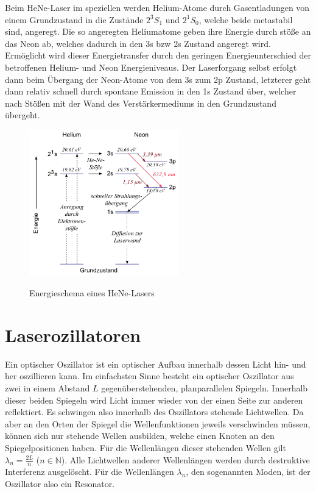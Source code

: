 \documentclass[bigchapter,colorback,accentcolor=tud4b,linedtoc,11pt]{tudreport}
\numberwithin{equation}{subsection}
\begin{document}
Beim HeNe-Laser im speziellen werden Helium-Atome durch Gasentladungen von einem Grundzustand in die Zustände $2^{3}S_{1}$ und $2^{1}S_{0}$, welche beide metastabil sind, angeregt. Die so angeregten Heliumatome geben ihre Energie durch stöße an das Neon ab, welches dadurch in den 3s bzw 2s Zustand angeregt wird. Ermöglicht wird dieser Energietransfer durch den geringen Energieunterschied der betroffenen Helium- und Neon Energieniveaus. Der Laserforgang selbst erfolgt dann beim Übergang der Neon-Atome von dem 3s zum 2p Zustand, letzterer geht dann relativ schnell durch spontane Emission in den 1s Zustand über, welcher nach Stößen mit der Wand des Verstärkermediums in den Grundzustand übergeht.

\begin{figure}[ht!]
\centering
\includegraphics[width=65mm]{img/5074.png}
\caption{Energieschema eines HeNe-Lasers}
\label{HeNeLaser}
\cite{HeNeNiveaus}
\end{figure}
\section{Laserozillatoren}
Ein optischer Oszillator ist ein optischer Aufbau innerhalb dessen Licht hin- und her oszillieren kann. Im einfachsten Sinne besteht ein optischer Oszillator aus zwei in einem Abstand \(L\) gegenüberstehenden, planparallelen Spiegeln. Innerhalb dieser beiden Spiegeln wird Licht immer wieder von der einen Seite zur anderen reflektiert. Es schwingen also innerhalb des Oszillators stehende Lichtwellen. Da aber an den Orten der Spiegel die Wellenfunktionen jeweils verschwinden müssen, können sich nur stehende Wellen ausbilden, welche einen Knoten an den Spiegelpositionen haben. Für die Wellenlängen dieser stehenden Wellen gilt \(\lambda_n = \frac{2L}{n}\) ($n \in \mathbb{N}$). Alle Lichtwellen anderer Wellenlängen werden durch destruktive Interferenz ausgelöscht. Für die Wellenlängen \(\lambda_n\), den sogenannten Moden, ist der Oszillator also ein Resonator.
\end{document}
